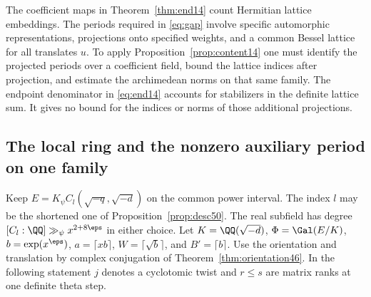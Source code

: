 \documentclass[a4paper,11pt]{article}
\theoremstyle{definition}
\theoremstyle{remark}
\numberwithin{equation}{section}
\begin{document}
The coefficient maps in Theorem~\ref{thm:end14} count Hermitian lattice embeddings. The periods required in \eqref{eq:gap} involve specific automorphic representations, projections onto specified weights, and a common Bessel lattice for all translates \(u\). To apply Proposition~\ref{prop:content14} one must identify the projected periods over a coefficient field, bound the lattice indices after projection, and estimate the archimedean norms on that same family. The endpoint denominator in \eqref{eq:end14} accounts for stabilizers in the definite lattice sum. It gives no bound for the indices or norms of those additional projections.

\subsection{The local ring and the nonzero auxiliary period on one family}\label{nav:II-23}
Keep \(E=K_\psi C_l(\sqrt{-q},\sqrt{-d})\) on the common
power interval. The index \(l\) may be the shortened one of
Proposition~\ref{prop:desc50}. The real subfield has degree
\([C_l:\QQ]\gg_\psi x^{2+8\eps}\) in either choice.
Let \(K=\QQ(\sqrt{-d})\), \(\Phi=\Gal(E/K)\),
\(b=\exp(x^\eps)\), \(a=\lceil xb\rceil\),
\(W=\lceil\sqrt b\rceil\), and \(B'=\lceil b\rceil\).
Use the orientation and translation by complex conjugation of
Theorem~\ref{thm:orientation46}. In the following statement
\(j\) denotes a cyclotomic twist and \(r\le s\) are matrix
ranks at one definite theta step.
\end{document}
